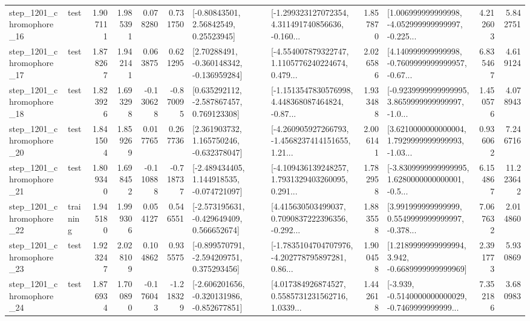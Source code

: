 \begin{tabular}{llrrrrllrlrr}
 step\_1201\_chromophore\_16 &      test &      1.907111 &    1.985391 &      0.078280 &  0.731750 &       [-0.80843501, 2.56842549, 0.25523945] &  [-1.299323127072354, 4.311491740856636, -0.160... &       1.857870 &  [1.006999999999998, -4.052999999999997, -0.225... &            4.212603 &          5.842751 \\
 step\_1201\_chromophore\_17 &      test &      1.878267 &    1.942141 &      0.063875 &  0.621295 &    [2.70288491, -0.360148342, -0.136959284] &  [-4.554007879322747, 1.1105776240224674, 0.479... &       2.026586 &  [4.140999999999998, -0.7609999999999957, -0.67... &            6.835467 &          4.619124 \\
 step\_1201\_chromophore\_18 &      test &      1.823926 &    1.693298 &     -0.130628 & -0.870095 &    [0.635292112, -2.587867457, 0.769123308] &  [-1.1513547830576998, 4.448368087464824, -0.87... &       1.933488 &  [-0.9239999999999995, 3.8659999999999997, -1.0... &            1.450576 &          4.078943 \\
 step\_1201\_chromophore\_20 &      test &      1.841504 &    1.859269 &      0.017765 &  0.267736 &    [2.361903732, 1.165750246, -0.632378047] &  [-4.260905927266793, -1.4568237414151655, 1.21... &       2.006141 &  [3.6210000000000004, 1.7929999999999993, -1.03... &            0.936062 &          7.246716 \\
 step\_1201\_chromophore\_21 &      test &      1.809340 &    1.698452 &     -0.110888 & -0.718737 &   [-2.489434405, 1.144918535, -0.074721097] &  [-4.109436139248257, 1.7931329403260095, 0.291... &       1.782958 &  [-3.8309999999999995, 1.6280000000000001, -0.5... &            6.154867 &         11.223642 \\
 step\_1201\_chromophore\_22 &  training &      1.945180 &    1.999306 &      0.054127 &  0.546551 &   [-2.573195631, -0.429649409, 0.566652674] &  [4.415630503499037, 0.7090837222396356, -0.292... &       1.883558 &  [3.991999999999999, 0.5549999999999997, -0.378... &            7.067632 &          2.014860 \\
 step\_1201\_chromophore\_23 &      test &      1.923247 &    2.028109 &      0.104862 &  0.935575 &   [-0.899570791, -2.594209751, 0.375293456] &  [-1.7835104704707976, -4.202778795897281, 0.86... &       1.900458 &   [1.2189999999999994, 3.942, -0.6689999999999969] &            2.391773 &          5.930869 \\
 step\_1201\_chromophore\_24 &      test &      1.876934 &    1.700890 &     -0.176043 & -1.218329 &  [-2.606201656, -0.320131986, -0.852677851] &  [4.017384926874527, 0.5585731231562716, 1.0339... &       1.442618 &  [-3.939, -0.5140000000000029, -0.7469999999999... &            7.352186 &          3.680983 \\

\end{tabular}
